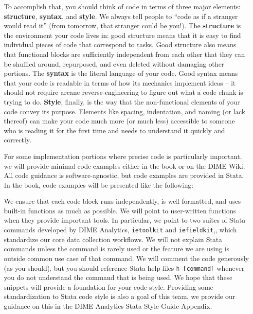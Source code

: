 To accomplish that, you should think of code in terms of three major elements:
\textbf{structure}, \textbf{syntax}, and \textbf{style}.
We always tell people to ``code as if a stranger would read it''
(from tomorrow, that stranger could be you!).
The \textbf{structure} is the environment your code lives in:
good structure means that it is easy to find individual pieces of code that correspond to tasks.
Good structure also means that functional blocks are sufficiently independent from each other
that they can be shuffled around, repurposed, and even deleted without damaging other portions.
The \textbf{syntax} is the literal language of your code.
Good syntax means that your code is readable
in terms of how its mechanics implement ideas --
it should not require arcane reverse-engineering
to figure out what a code chunk is trying to do.
\textbf{Style}, finally, is the way that the non-functional elements of your code convey its purpose.
Elements like spacing, indentation, and naming (or lack thereof) can make your code much more 
(or much less) accessible to someone who is reading it for the first time and needs to understand it quickly and correctly.

For some implementation portions where precise code is particularly important,
we will provide minimal code examples either in the book or on the DIME Wiki.
All code guidance is software-agnostic, but code examples are provided in Stata. 
In the book, code examples will be presented like the following:


We ensure that each code block runs independently, is well-formatted, 
and uses built-in functions as much as possible.
We will point to user-written functions when they provide important tools.
In particular, we point to two suites of Stata commands developed by DIME Analytics,
\texttt{ietoolkit} and 
\texttt{iefieldkit},,
which standardize our core data collection workflows.
We will not explain Stata commands unless the command is rarely used 
or the feature we are using is outside common use case of that command.
We will comment the code generously (as you should),
but you should reference Stata help-files \texttt{h [command]}
whenever you do not understand the command that is being used.
We hope that these snippets will provide a foundation for your code style.
Providing some standardization to Stata code style is also a goal of this team,
we provide our guidance on this in the DIME Analytics Stata Style Guide Appendix. 



\mainmatter
